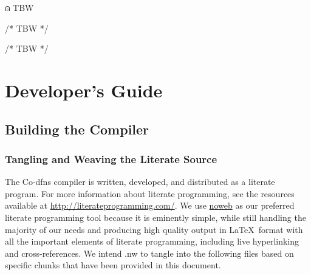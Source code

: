 \documentclass{article}%
\begin{document}
\nwenddocs{}\endmoddef\nwstartdeflinemarkup\nwenddeflinemarkup
⍝ TBW
\nwendcode{}\nwdocspar

\nwenddocs{}\endmoddef\nwstartdeflinemarkup\nwenddeflinemarkup
/* TBW */
\nwendcode{}\nwdocspar

\nwenddocs{}\endmoddef\nwstartdeflinemarkup\nwenddeflinemarkup
/* TBW */
\nwendcode{}\nwdocspar

\section{Developer's Guide}

\subsection{Building the Compiler}

\subsubsection{Tangling and Weaving the Literate Source}

The Co-dfns compiler is written, developed, and distributed as a 
literate program. 
For more information about literate programming,
see the resources available at \url{http://literateprogramming.com/}.
We use \href{https://www.cs.tufts.edu/~nr/noweb/}{noweb} as our 
preferred literate programming tool because it is eminently simple, 
while still handling the majority of our needs and producing high 
quality output in \LaTeX\ format with all the important elements of 
literate programming, including live hyperlinking and cross-references.
We intend {\Tt{}.nw\nwendquote} to tangle into the following files based on 
specific chunks that have been provided in this document.
\end{document}
